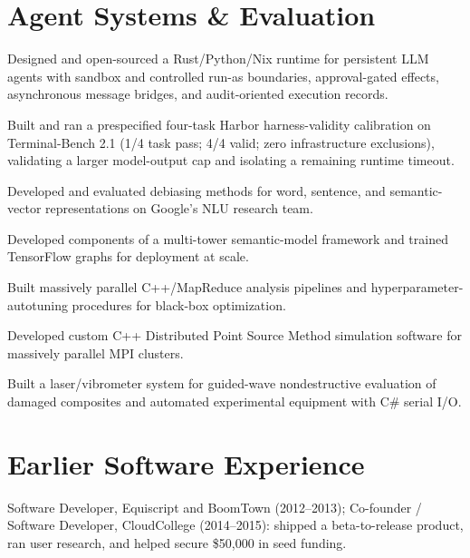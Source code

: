 \documentclass{semantic-resume}
\begin{document}
\section{Agent Systems \& Evaluation}
\begin{resumeitems}
  \item Designed and open-sourced a Rust/Python/Nix runtime for persistent LLM agents
    with sandbox and controlled run-as boundaries, approval-gated effects,
    asynchronous message bridges, and audit-oriented execution records.
  \item Built and ran a prespecified four-task Harbor harness-validity calibration on
    Terminal-Bench 2.1 (1/4 task pass; 4/4 valid; zero infrastructure exclusions),
    validating a larger model-output cap and isolating a remaining runtime timeout.
\end{resumeitems}

\begin{resumeitems}
  \item Developed and evaluated debiasing methods for word, sentence, and
    semantic-vector representations on Google's NLU research team.
  \item Developed components of a multi-tower semantic-model framework and trained
    TensorFlow graphs for deployment at scale.
  \item Built massively parallel C++/MapReduce analysis pipelines and
    hyperparameter-autotuning procedures for black-box optimization.
\end{resumeitems}

\begin{resumeitems}
  \item Developed custom C++ Distributed Point Source Method simulation software
    for massively parallel MPI clusters.
  \item Built a laser/vibrometer system for guided-wave nondestructive evaluation
    of damaged composites and automated experimental equipment with C\# serial I/O.
\end{resumeitems}

\section{Earlier Software Experience}
\small
Software Developer, Equiscript and BoomTown (2012--2013); Co-founder / Software
Developer, CloudCollege (2014--2015): shipped a beta-to-release product, ran user
research, and helped secure \$50{,}000 in seed funding.
\normalsize
\end{document}
